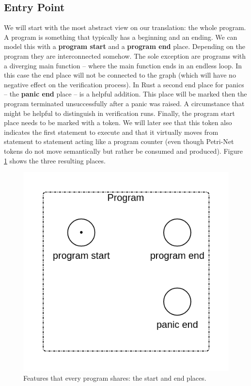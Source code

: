 \subsection{Entry Point}
We will start with the most abstract view on our translation: the whole program.
A program is something that typically has a beginning and an ending.
We can model this with a \textbf{program start} and a \textbf{program end} place.
Depending on the program they are interconnected somehow.
The sole exception are programs with a diverging main function -- where the main function ends in an endless loop.
In this case the end place will not be connected to the graph (which will have no negative effect on the verification process).
In Rust a second end place for panics -- the \textbf{panic end} place -- is a helpful addition.
This place will be marked then the program terminated unsuccessfully after a panic was raised.
A circumstance that might be helpful to distinguish in verification runs.
Finally, the program start place needs to be marked with a token.
We will later see that this token also indicates the first statement to execute and that it virtually moves from statement to statement acting like a program counter (even though Petri-Net tokens do not move semantically but rather be consumed and produced).
Figure \ref{program_stub} shows the three resulting places.
\begin{figure}
    \centering
    \includegraphics[width=.4\textwidth]{../diagrams/basic_program_new.png}
    \caption{
        Features that every program shares: the start and end places.
    }
    \label{program_stub}
\end{figure}

